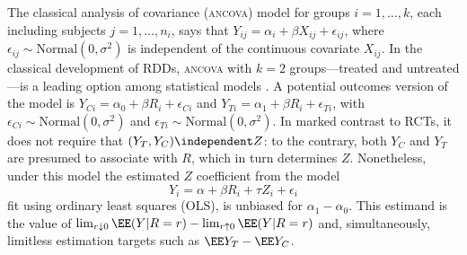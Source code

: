 The classical analysis of covariance (\textsc{ancova}) model for
groups $i=1,\ldots, k$, each including subjects $j=1, \ldots, n_{i}$,
says that
$Y_{ij} = \alpha_{i} + \beta X_{ij} + \epsilon_{ij}$, where $\epsilon_{ij}
\sim \mathrm{Normal}(0, \sigma^{2})$ is independent of the continuous
covariate $X_{ij}$.
In the classical development of RDDs, \textsc{ancova} with $k=2$
groups---treated and untreated---is a leading option among statistical
models
\citep{thistlethwaite1960regression}.
A potential outcomes version of the model is
 $Y_{Ci} = \alpha_{0} + \beta R_{i} + \epsilon_{Ci}$ and
$Y_{Ti} = \alpha_{1}  + \beta R_{i} + \epsilon_{Ti}$, with
 $\epsilon_{Ci} \sim \mathrm{Normal}(0, \sigma^{2})$ and
 $\epsilon_{Ti} \sim \mathrm{Normal}(0, \sigma^{2})$.
In marked contrast to RCTs, it does
not require that $(Y_{T}, Y_{C}) \independent Z$: to the contrary, both
$Y_{C}$ and $Y_{T}$ are presumed to associate with $R$, which in turn
determines $Z$.
Nonetheless, under this model the estimated $Z$ coefficient from the
model
\begin{equation}\label{eq:classicOLS}
Y_i=\alpha+\beta R_i+\tau Z_i+\epsilon_i
\end{equation}
fit using ordinary least squares (OLS), is unbiased for
$\alpha_{1} - \alpha_{0}$.
This estimand is the value of  $\lim_{r\downarrow 0} \EE(Y | R=r) -
\lim_{r\uparrow 0} \EE(Y | R=r)$ and, simultaneously,
limitless estimation targets such as $\EE Y_{T}  - \EE Y_{C}$.

